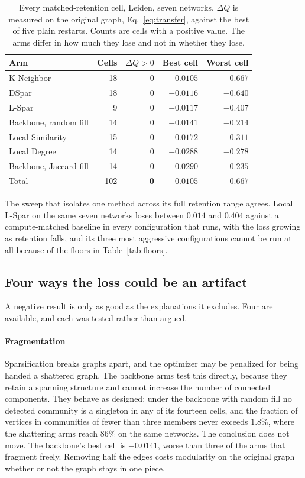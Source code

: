 \begin{table}[t]
\centering
\caption{Every matched-retention cell, Leiden, seven networks. $\Delta Q$ is
measured on the original graph, Eq.~\eqref{eq:transfer}, against the best of five
plain restarts. Counts are cells with a positive value. The arms differ in how
much they lose and not in whether they lose.}
\label{tab:negative}
\small
\setlength{\tabcolsep}{4pt}
\begin{tabular}{@{}lrrrr@{}}
\toprule
Arm & Cells & $\Delta Q > 0$ & Best cell & Worst cell\\
\midrule
K-Neighbor            & 18 & 0 & $-0.0105$ & $-0.667$\\
DSpar                 & 18 & 0 & $-0.0116$ & $-0.640$\\
L-Spar                &  9 & 0 & $-0.0117$ & $-0.407$\\
Backbone, random fill & 14 & 0 & $-0.0141$ & $-0.214$\\
Local Similarity      & 15 & 0 & $-0.0172$ & $-0.311$\\
Local Degree          & 14 & 0 & $-0.0288$ & $-0.278$\\
Backbone, Jaccard fill& 14 & 0 & $-0.0290$ & $-0.235$\\
\midrule
Total                 & 102 & \textbf{0} & $-0.0105$ & $-0.667$\\
\bottomrule
\end{tabular}
\end{table}

The sweep that isolates one method across its full retention range agrees. Local
L-Spar on the same seven networks loses between $0.014$ and
$0.404$ against a compute-matched baseline in every configuration that runs, with
the loss growing as retention falls, and its three most aggressive configurations
cannot be run at all because of the floors in Table~\ref{tab:floors}.

\subsection{Four ways the loss could be an artifact}\label{sec:negative:artifact}

A negative result is only as good as the explanations it excludes. Four are
available, and each was tested rather than argued.

\paragraph{Fragmentation}
Sparsification breaks graphs apart, and the optimizer may be penalized for being
handed a shattered graph. The backbone arms test this directly, because they
retain a spanning structure and cannot increase the number of connected
components. They behave as designed: under the backbone with random fill no
detected community is a singleton in any of its fourteen cells, and the fraction
of vertices in communities of fewer than three members never exceeds $1.8\%$,
where the shattering arms reach $86\%$ on the same networks. The conclusion does
not move. The backbone's best cell is $-0.0141$, worse than three of the arms that
fragment freely. Removing half the edges costs modularity on the original graph
whether or not the graph stays in one piece.

